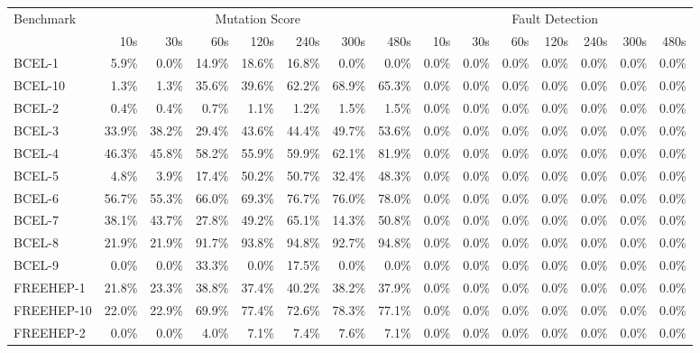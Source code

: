 \begin{tabular}{ l rrrrrrr rrrrrrr}\toprule 
 Benchmark &  \multicolumn{7}{c}{Mutation Score}  &  \multicolumn{7}{c}{Fault Detection} \\ 
 & 10s & 30s & 60s & 120s & 240s & 300s & 480s & 10s & 30s & 60s & 120s & 240s & 300s & 480s \\ 
\midrule 
BCEL-1 &  5.9\% &  0.0\% &  14.9\% &  18.6\% &  16.8\% &  0.0\% &  0.0\% &  0.0\% &  0.0\% &  0.0\% &  0.0\% &  0.0\% &  0.0\% &  0.0\%\\ 
BCEL-10 &  1.3\% &  1.3\% &  35.6\% &  39.6\% &  62.2\% &  68.9\% &  65.3\% &  0.0\% &  0.0\% &  0.0\% &  0.0\% &  0.0\% &  0.0\% &  0.0\%\\ 
BCEL-2 &  0.4\% &  0.4\% &  0.7\% &  1.1\% &  1.2\% &  1.5\% &  1.5\% &  0.0\% &  0.0\% &  0.0\% &  0.0\% &  0.0\% &  0.0\% &  0.0\%\\ 
BCEL-3 &  33.9\% &  38.2\% &  29.4\% &  43.6\% &  44.4\% &  49.7\% &  53.6\% &  0.0\% &  0.0\% &  0.0\% &  0.0\% &  0.0\% &  0.0\% &  0.0\%\\ 
BCEL-4 &  46.3\% &  45.8\% &  58.2\% &  55.9\% &  59.9\% &  62.1\% &  81.9\% &  0.0\% &  0.0\% &  0.0\% &  0.0\% &  0.0\% &  0.0\% &  0.0\%\\ 
BCEL-5 &  4.8\% &  3.9\% &  17.4\% &  50.2\% &  50.7\% &  32.4\% &  48.3\% &  0.0\% &  0.0\% &  0.0\% &  0.0\% &  0.0\% &  0.0\% &  0.0\%\\ 
BCEL-6 &  56.7\% &  55.3\% &  66.0\% &  69.3\% &  76.7\% &  76.0\% &  78.0\% &  0.0\% &  0.0\% &  0.0\% &  0.0\% &  0.0\% &  0.0\% &  0.0\%\\ 
BCEL-7 &  38.1\% &  43.7\% &  27.8\% &  49.2\% &  65.1\% &  14.3\% &  50.8\% &  0.0\% &  0.0\% &  0.0\% &  0.0\% &  0.0\% &  0.0\% &  0.0\%\\ 
BCEL-8 &  21.9\% &  21.9\% &  91.7\% &  93.8\% &  94.8\% &  92.7\% &  94.8\% &  0.0\% &  0.0\% &  0.0\% &  0.0\% &  0.0\% &  0.0\% &  0.0\%\\ 
BCEL-9 &  0.0\% &  0.0\% &  33.3\% &  0.0\% &  17.5\% &  0.0\% &  0.0\% &  0.0\% &  0.0\% &  0.0\% &  0.0\% &  0.0\% &  0.0\% &  0.0\%\\ 
FREEHEP-1 &  21.8\% &  23.3\% &  38.8\% &  37.4\% &  40.2\% &  38.2\% &  37.9\% &  0.0\% &  0.0\% &  0.0\% &  0.0\% &  0.0\% &  0.0\% &  0.0\%\\ 
FREEHEP-10 &  22.0\% &  22.9\% &  69.9\% &  77.4\% &  72.6\% &  78.3\% &  77.1\% &  0.0\% &  0.0\% &  0.0\% &  0.0\% &  0.0\% &  0.0\% &  0.0\%\\ 
FREEHEP-2 &  0.0\% &  0.0\% &  4.0\% &  7.1\% &  7.4\% &  7.6\% &  7.1\% &  0.0\% &  0.0\% &  0.0\% &  0.0\% &  0.0\% &  0.0\% &  0.0\%\\ 

\end{tabular}
